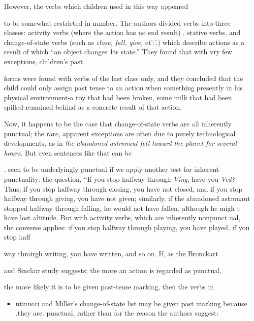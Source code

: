 However, the verbs which children used in this way appeared

to be somewhat restricted in number. The authors divided verbs into three classes: activity verbs (where the action has no end result) , stative verbs, and change-of-state verbs (such as \textit{close,} \textit{fall,} \textit{give,} et':'.) which describe actions as a result of which ``an object changes 1ts state.'' They found that with vry few exceptions, children's past


forms were found with verbs of the last class only, and they concluded that the child could only assign past tense to an action when some\-thing presently in his physical environment-a toy that had been broken, some milk that had been spilled-remained behind as a concrete result of that action.

Now, it happens to be the case that change-of-state verbs are all inherently punctual; the rare, apparent exceptions are often due to purely technological developments, as in \textit{the} \textit{abandoned} \textit{astronaut} \textit{fell} \textit{toward} \textit{the} \textit{planet} \textit{for} \textit{several} \textit{hours.} But even sentences like that can be

. seen to be underlyingly punctual if we apply another test for inherent punctuality: the question, ``If you stop halfway through \textit{Vi}\textit{n}\textit{g,} have you \textit{Ved?{\textquotedbl}} Thus, if you stop halfway through closing, you have not closed, and if you stop halfway through giving, you have not given; similarly, if the abandoned astronaut stopped halfway through falling, he would not have fallen, although he migh t have lost altitude. But with activity verbs, which are inherently nonpunct ual, the converse applies: if you stop halfway through playing, you have played, if you stop half\-

way throirgh writing, you have written, and so on. If, as the Bronckart

and Sinclair study suggests; the more an action is regarded as punctual,

the more likely it is to be given past-tense marking, then the verbs in

\begin{itemize}
\item ntinucci and Miller's change-of-state list may be given past marking bei:ause .they are. punctual, rather than for the reason the authors suggest:
\end{itemize}

